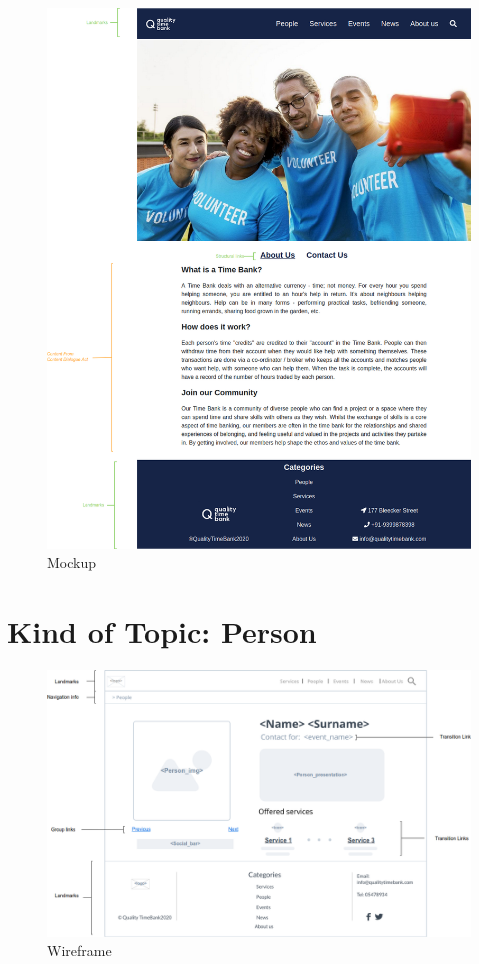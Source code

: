 \documentclass[a4paper, 11pt, parskip=half, headsepline]{scrreprt}
\begin{document}
\begin{figure}[H]
    \centering
    \includegraphics[width=1\linewidth, keepaspectratio]{mockups/About_Us}
    \caption{Mockup}
\end{figure}

\section{Kind of Topic: Person}

\begin{figure}[H]
    \centering
    \includegraphics[width=1\linewidth, keepaspectratio]{wireframes/KindOfTopic-Person}
    \caption{Wireframe}
\end{figure}
\end{document}
